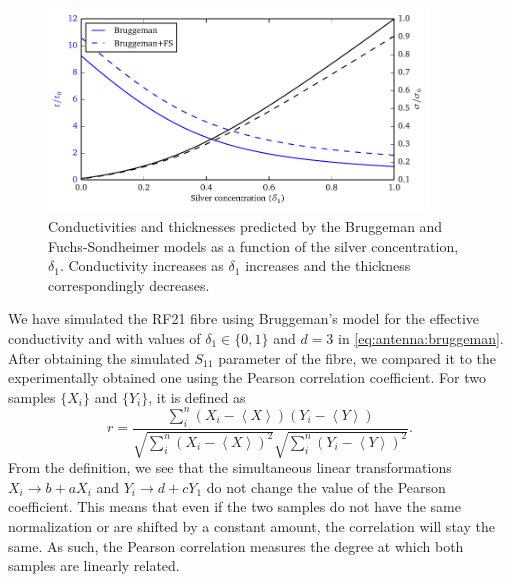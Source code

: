 \begin{figure}
  \centering
  \includegraphics[width=0.9\textwidth]{figs/active/comparisonThickness.pdf}
  \caption[Thickness and conductivity as a function of the silver concentration]
	  {Conductivities and thicknesses predicted by the Bruggeman and Fuchs-Sondheimer
	  models as a function of the silver concentration, $\delta_1$. Conductivity increases
	  as $\delta_1$ increases and the thickness correspondingly decreases.}
  \label{fig:antenna.thicknessRatios}
\end{figure}

We have simulated the RF21 fibre using Bruggeman's model
for the effective conductivity and with values
of $\delta_1\in\{0,1\}$ and $d=3$ in \eqref{eq:antenna:bruggeman}.
After obtaining the simulated $S_\text{11}$ parameter of the fibre,
we compared it to the experimentally obtained one using the Pearson
correlation coefficient. For two samples $\{X_i\}$ and 
$\{Y_i\}$, it is defined as
  \begin{equation}
    r = \frac{\sum_i^n\left(X_i-\left\langle X\right\rangle\right)\left(Y_i-\left\langle Y\right\rangle\right)}
	     {\sqrt{\sum_i^n\left(X_i-\left\langle X\right\rangle\right)^2}\sqrt{\sum_i^n\left(Y_i-\left\langle Y\right\rangle\right)^2}}.
  \end{equation}
From the definition, we see that the simultaneous linear transformations $X_i\rightarrow b+aX_i$ and $Y_i\rightarrow d+cY_1$
do not change the value of the Pearson coefficient. This means that even if the two samples
do not have the same normalization or are shifted by a constant amount, the correlation 
will stay the same. As such, the Pearson correlation measures the degree at which 
both samples are linearly related. 

